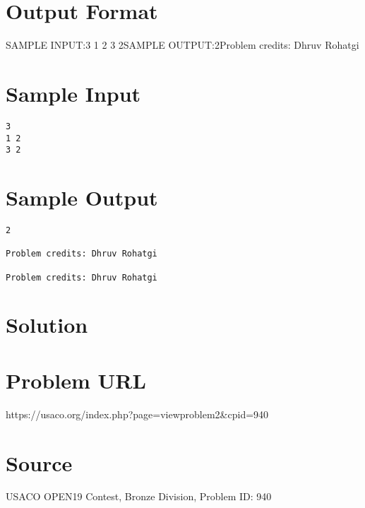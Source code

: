 \documentclass[12pt]{article}
\begin{document}
\section*{Output Format}
SAMPLE INPUT:3
1 2
3 2SAMPLE OUTPUT:2Problem credits: Dhruv Rohatgi

\section*{Sample Input}
\begin{verbatim}
3
1 2
3 2
\end{verbatim}

\section*{Sample Output}
\begin{verbatim}
2

Problem credits: Dhruv Rohatgi

Problem credits: Dhruv Rohatgi
\end{verbatim}

\section*{Solution}


\section*{Problem URL}
https://usaco.org/index.php?page=viewproblem2&cpid=940

\section*{Source}
USACO OPEN19 Contest, Bronze Division, Problem ID: 940
\end{document}
